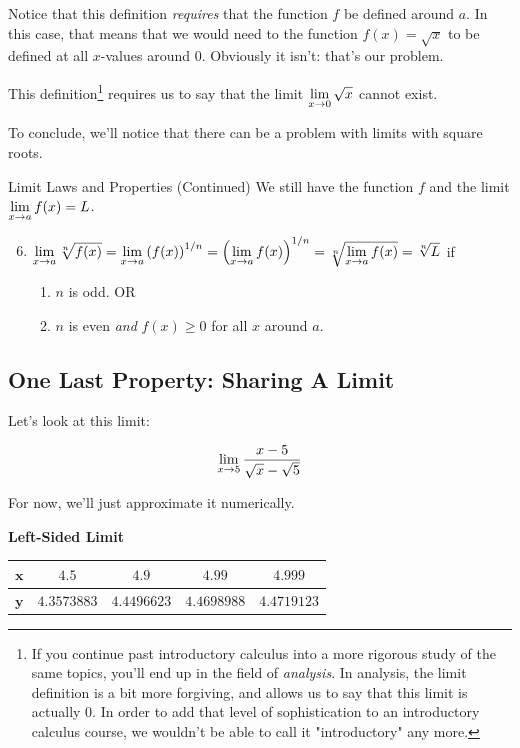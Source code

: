 Notice that this definition \textit{requires} that the function $f$ be defined around $a$.
In this case, that means that we would need to the function $f(x)=\sqrt{x}$ to be defined at all $x$-values around 0.
Obviously it isn't: that's our problem.

This definition\footnote{If you continue past introductory calculus into a more rigorous study of the same topics, you'll end up in the field of \textit{analysis}. In analysis, the limit definition is a bit more forgiving, and allows us to say that this limit is actually 0. In order to add that level of sophistication to an introductory calculus course, we wouldn't be able to call it "introductory" any more.} requires us to say that the limit $\displaystyle \lim_{x\to0} \sqrt{x}$ cannot exist.

To conclude, we'll notice that there can be a problem with limits with square roots.

\begin{imp}{Limit Laws and Properties (Continued)}
  We still have the function $f$ and the limit $\displaystyle \lim_{x\to a} f(x) = L$.
  \begin{enumerate}
    \setcounter{enumi}{5}
    \item $\displaystyle \lim_{x\to a} \sqrt[n]{f(x)} = \displaystyle \lim_{x\to a} \left(f(x)\right)^{1/n} = \left(\displaystyle \lim_{x\to a} f(x)\right)^{1/n} = \sqrt[n]{\displaystyle \lim_{x\to a} f(x)} = \sqrt[n]{L}$ if
    \begin{enumerate}
      \item $n$ is odd.
      OR
      \item $n$ is even \textit{and} $f(x)\geq 0$ for all $x$ around $a$.
    \end{enumerate}
  \end{enumerate}
\end{imp}

\subsection*{One Last Property: Sharing A Limit}

Let's look at this limit:

\[ \displaystyle \lim_{x\to 5} \dfrac{x-5}{\sqrt{x}-\sqrt{5}} \]

For now, we'll just approximate it numerically.

\textbf{Left-Sided Limit}

\begin{tabular}{ccccc} \toprule
  $\bm{x}$ & $4.5$ & $4.9$ & $4.99$ & $4.999$ \\ \midrule
  $\bm{y}$ & $4.3573883$ & $4.4496623$ & $4.4698988$ & $4.4719123$\\ \bottomrule
\end{tabular}

